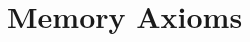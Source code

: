 \documentclass{article}
\begin{document}
\begin{comment}
\begin{figure}
  \[\mathit{dealloc\_locals} ~ \alpha ~ e =
  \begin{cases}
    \mathit{stk\_free} ~ \alpha' ~ C ~ i &
    \textnormal{if for some } id, e ~ id = (\mathbf{L}(C),i),\\
    & \textnormal{where } \mathit{dealloc\_locals} ~ \alpha ~ e[id \mapsto \bot] =
    \alpha' \\
    \mathit{stk\_free} ~ \alpha' ~ b ~ i &
    \textnormal{if for some } id, e ~ id = (\mathbf{S}(b,i),i),\\
    & \textnormal{where } \mathit{dealloc\_locals} ~ \alpha ~ e[id \mapsto \bot] =
    \alpha' \\
    \alpha & \textnormal{otherwise} \\
  \end{cases}\]
              
  \judgment[Return]
           {\(\mathit{dealloc\_locals} ~ \alpha ~ e = \alpha'\)}
           {\(C,\alpha,M,e \mid \mathtt{return} ~ v \longrightarrow
             \mathit{RET}(\alpha,M,v)\)}


  \caption{Call and Return Semantics (Continuations omitted)}
  \label{fig:callret}
\end{figure}
\end{comment}

\section{Memory Axioms}
\label{sec:axioms}
\end{document}
